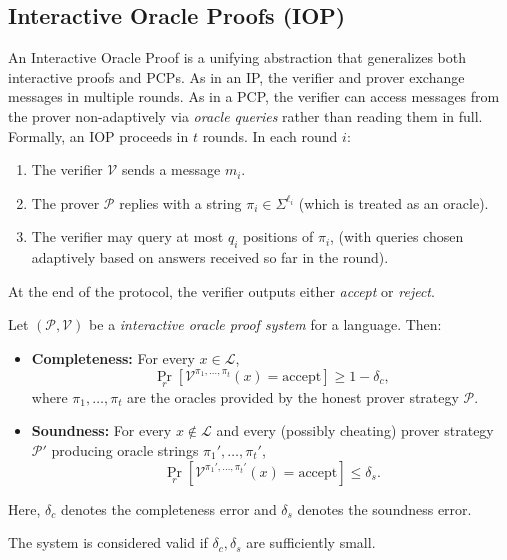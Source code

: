 \subsection{Interactive Oracle Proofs (IOP)}

An Interactive Oracle Proof is a unifying abstraction that generalizes both interactive proofs and PCPs. As in an IP, the verifier and prover exchange messages in multiple rounds. As in a PCP, the verifier can access messages from the prover non-adaptively via \emph{oracle queries} rather than reading them in full. \\

Formally, an IOP proceeds in $t$ rounds. In each round $i$:
\begin{enumerate}
    \item The verifier $\mathcal{V}$ sends a message $m_i$.
    \item The prover $\mathcal{P}$ replies with a string $\pi_i \in \Sigma^{\ell_i}$ (which is treated as an oracle).
    \item The verifier may query at most $q_i$ positions of $\pi_i$, (with queries chosen adaptively based on answers received so far in the round).
\end{enumerate}

At the end of the protocol, the verifier outputs either \emph{accept} or \emph{reject}.

\begin{definition}
Let $(\mathcal{P}, \mathcal{V})$ be a \emph{interactive oracle proof system} for a language. Then:
\begin{itemize}
    \item \textbf{Completeness:} For every $x \in \mathcal{L}$,
    \[
    \Pr_r[\mathcal{V}^{\pi_1,\dots,\pi_t}(x) = \text{accept}] \ge 1 - \delta_c,
    \]
    where $\pi_1,\dots,\pi_t$ are the oracles provided by the honest prover strategy $\mathcal{P}$.
    \item \textbf{Soundness:} For every $x \notin \mathcal{L}$ and every (possibly cheating) prover strategy $\mathcal{P}'$ producing oracle strings $\pi_1',\dots,\pi_t'$,
    \[
    \Pr_r[\mathcal{V}^{\pi_1',\dots,\pi_t'}(x) = \text{accept}] \le \delta_s.
    \]
\end{itemize}
Here, $\delta_c$ denotes the completeness error and  $\delta_s$ denotes the soundness error.  
\end{definition}

\begin{remark}
The system is considered valid if $\delta_c, \delta_s$ are sufficiently small.
\end{remark} 


